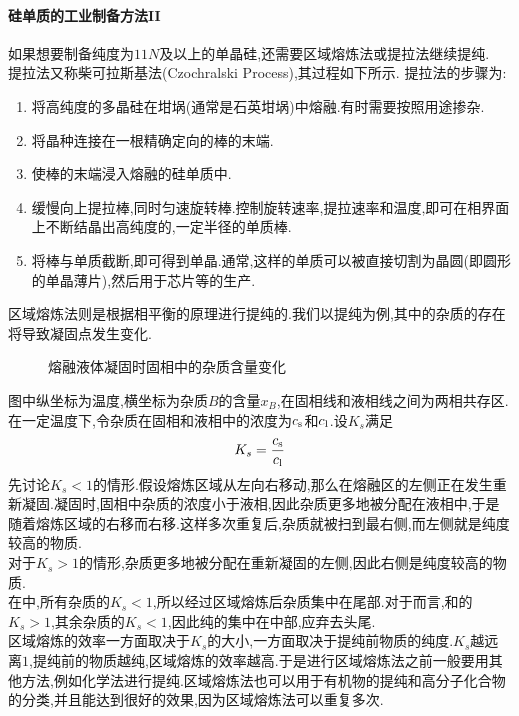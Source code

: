 \documentclass{ctexart}
\begin{document}
\paragraph{硅单质的工业制备方法II}
如果想要制备纯度为$11N$及以上的单晶硅,还需要区域熔炼法或提拉法继续提纯.\\
\indent 提拉法又称柴可拉斯基法(Czochralski Process),其过程如下所示.
提拉法的步骤为:
\begin{enumerate}[label=$\mathit{Step\ \arabic*.}$,topsep=0pt,parsep=0pt,itemsep=0pt,partopsep=0pt,leftmargin=*]
    \item 将高纯度的多晶硅在坩埚(通常是石英坩埚)中熔融.有时需要按照用途掺杂.
    \item 将晶种连接在一根精确定向的棒的末端.
    \item 使棒的末端浸入熔融的硅单质中.
    \item 缓慢向上提拉棒,同时匀速旋转棒.控制旋转速率,提拉速率和温度,即可在相界面上不断结晶出高纯度的,一定半径的单质棒.
    \item 将棒与单质截断,即可得到单晶.通常,这样的单质可以被直接切割为晶圆(即圆形的单晶薄片),然后用于芯片等的生产.
\end{enumerate}

\indent 区域熔炼法则是根据相平衡的原理进行提纯的.我们以提纯为例,其中的杂质的存在将导致凝固点发生变化.
\begin{figure}[H]
    \centering
    \caption{熔融液体凝固时固相中的杂质含量变化}
\end{figure}
图中纵坐标为温度,横坐标为杂质$B$的含量$x_B$,在固相线和液相线之间为两相共存区.在一定温度下,令杂质在固相和液相中的浓度为$c_{\text s}$和$c_{\text l}$.设$K_s$满足
\[K_s=\dfrac{c_{\text s}}{c_{\text l}}\]
\indent 先讨论$K_s<1$的情形.假设熔炼区域从左向右移动,那么在熔融区的左侧正在发生重新凝固.凝固时,固相中杂质的浓度小于液相,因此杂质更多地被分配在液相中,于是随着熔炼区域的右移而右移.这样多次重复后,杂质就被扫到最右侧,而左侧就是纯度较高的物质.\\
\indent 对于$K_s>1$的情形,杂质更多地被分配在重新凝固的左侧,因此右侧是纯度较高的物质.\\
\indent 在中,所有杂质的$K_s<1$,所以经过区域熔炼后杂质集中在尾部.对于而言,和的$K_s>1$,其余杂质的$K_s<1$,因此纯的集中在中部,应弃去头尾.\\
\indent 区域熔炼的效率一方面取决于$K_s$的大小,一方面取决于提纯前物质的纯度.$K_s$越远离$1$,提纯前的物质越纯,区域熔炼的效率越高.于是进行区域熔炼法之前一般要用其他方法,例如化学法进行提纯.区域熔炼法也可以用于有机物的提纯和高分子化合物的分类,并且能达到很好的效果,因为区域熔炼法可以重复多次.
\end{document}
